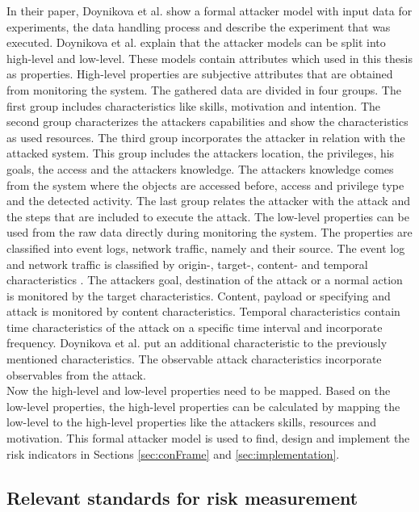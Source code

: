 In their paper, Doynikova et al. \cite{DBLP:conf/crisis/DoynikovaNGK20} show a formal attacker model with input data for experiments, the data handling process and describe the experiment
that was executed. Doynikova et al. explain that the attacker models can be split into high-level and low-level. These models contain attributes which used in this thesis as properties.
High-level properties are subjective attributes that are obtained from monitoring the system. The gathered data are divided in four groups. The first group includes characteristics like
skills, motivation and intention. The second group characterizes the attackers capabilities and show the characteristics as used resources. The third group incorporates the attacker in
relation with the attacked system. This group includes the attackers location, the privileges, his goals, the access and the attackers knowledge. The attackers knowledge comes from the
system where the objects are accessed before, access and privilege type and the detected activity. The last group relates the attacker with the attack and the steps that are included to
execute the attack. The low-level properties can be used from the raw data directly during monitoring the system. The properties are classified into event logs, network traffic, namely
and their source. The event log and network traffic is classified by origin-, target-, content- and temporal characteristics \cite{DBLP:journals/ijcysa/FraunholzKAS17}. The attackers
goal, destination of the attack or a normal action is monitored by the target characteristics. Content, payload or specifying and attack is monitored by content characteristics. Temporal
characteristics contain time characteristics of the attack on a specific time interval and incorporate frequency. Doynikova et al. put an additional characteristic to the previously
mentioned characteristics. The observable attack characteristics incorporate observables from the attack. \\
Now the high-level and low-level properties need to be mapped. Based on the low-level properties, the high-level properties can be calculated by mapping the low-level to the high-level properties like the attackers skills, resources and motivation. This formal attacker model is used to find, design and implement the risk indicators in Sections \ref{sec:conFrame} and \ref{sec:implementation}.

\subsection{Relevant standards for risk measurement}

